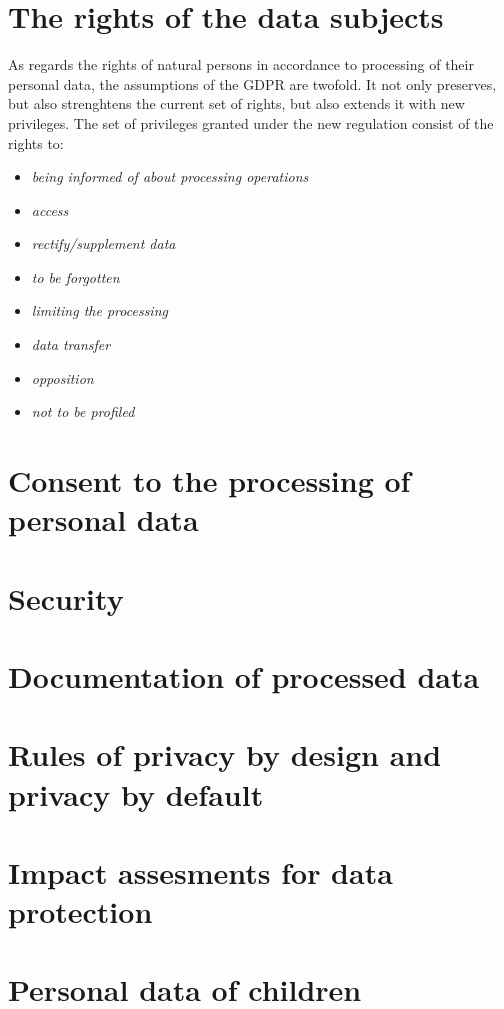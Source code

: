 \documentclass[en, noamssymb]{mgr}
\begin{document}
\section{The rights of the data subjects}

As regards the rights of natural persons in accordance to processing of their personal data, the assumptions of the GDPR are twofold. It not only preserves, but also strenghtens the current set of rights, but also extends it with new privileges.
The set of privileges granted under the new regulation consist of the rights to\cite{giodo}:

\begin{itemize}

\item \textit{being informed of about processing operations}

\item \textit{access}
\item \textit{rectify/supplement data}
\item \textit{to be forgotten}
\item \textit{limiting the processing}
\item \textit{data transfer}
\item \textit{opposition}
\item \textit{not to be profiled}

\end{itemize}


\section{Consent to the processing of personal data}
\section{Security}
\section{Documentation of processed data}
\section{Rules of privacy by design and privacy by default}
\section{Impact assesments for data protection}
\section{Personal data of children}
\end{document}
